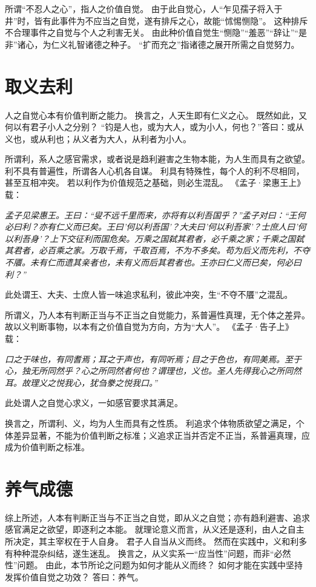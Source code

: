 \documentclass[11pt]{article}
\begin{document}
所谓“不忍人之心”，指人之价值自觉。
由于此自觉心，人“乍见孺子将入于井”时，皆有此事件为不应当之自觉，遂有排斥之心，故能“怵惕恻隐”。
这种排斥不合理事件之自觉与个人之利害无关。
由此种价值自觉生“恻隐”“羞恶”“辞让”“是非”诸心，为仁义礼智诸德之种子。
“扩而充之”指诸德之展开所需之自觉努力。

\section{取义去利}
人之自觉心本有价值判断之能力。
换言之，人天生即有仁义之心。
既然如此，又何以有君子小人之分别？
“钧是人也，或为大人，或为小人，何也？”答曰：或从义也，或从利也；从义者为大人，从利者为小人。

\newline

所谓利，系人之感官需求，或者说是趋利避害之生物本能，为人生而具有之欲望。
利不具有普遍性，所谓各人心机各自谋。
利具有特殊性，每个人的利不尽相同，甚至互相冲突。
若以利作为价值规范之基础，则必生混乱。
《孟子·梁惠王上》载：

\textit{孟子见梁惠王。王曰：“叟不远千里而来，亦将有以利吾国乎？”孟子对曰：“王何必曰利？亦有仁义而已矣。王曰’何以利吾国’？大夫曰’何以利吾家’？士庶人曰’何以利吾身’？上下交征利而国危矣。万乘之国弑其君者，必千乘之家；千乘之国弑其君者，必百乘之家。万取千焉，千取百焉，不为不多矣。苟为后义而先利，不夺不餍。未有仁而遗其亲者也，未有义而后其君者也。王亦曰仁义而已矣，何必曰利？”}

此处谓王、大夫、士庶人皆一味追求私利，彼此冲突，生“不夺不餍”之混乱。

\newline

所谓义，乃人本有判断正当与不正当之自觉能力，系普遍性真理，无个体之差异。
故以义判断事物，以本有之价值自觉为方向，方为“大人”。
《孟子·告子上》载：

\textit{口之于味也，有同耆焉；耳之于声也，有同听焉；目之于色也，有同美焉。至于心，独无所同然乎？心之所同然者何也？谓理也，义也。圣人先得我心之所同然耳。故理义之悦我心，犹刍豢之悦我口。”}

此处谓人之自觉心求义，一如感官要求其满足。

\newline

换言之，所谓利、义，均为人生而具有之性质。
利追求个体物质欲望之满足，个体差异显著，不能为价值判断之标准；义追求正当并否定不正当，系普遍真理，应成为价值判断之标准。
  
\section{养气成德}
综上所述，人本有判断正当与不正当之自觉，即从义之自觉；亦有趋利避害、追求感官满足之欲望，即逐利之本能。
就理论意义而言，从义还是逐利，由人之自主所决定，其主宰权在于人自身。
君子人自当从义而终。
然而在实践中，义和利多有种种混杂纠结，遂生迷乱。
换言之，从义实系一“应当性”问题，而非“必然性”问题。
由此，本节所论之问题为如何才能从义而终？
如何才能在实践中坚持发挥价值自觉之功效？
答曰：养气。
\end{document}
